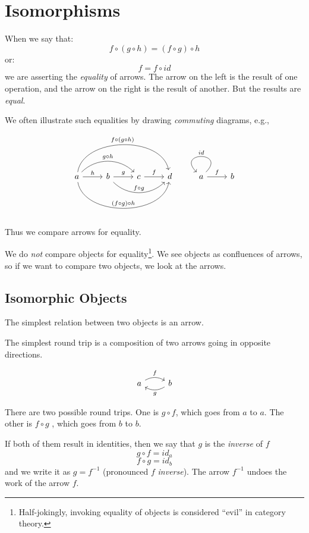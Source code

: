 \documentclass[DaoFP]{subfiles}
\begin{document}
\setcounter{chapter}{2}


\chapter{Isomorphisms}

When we say that:
\[f \circ (g \circ h) = (f \circ g) \circ h \]
or:
\[ f = f \circ id \]
we are asserting the \emph{equality} of arrows. The arrow on the left is the result of one operation, and the arrow on the right is the result of another. But the results are \emph{equal}.

We often illustrate such equalities by drawing \emph{commuting} diagrams, e.g.,

\[
 \begin{tikzcd}
 a
 \arrow[r, "h"]
 \arrow[rr, bend left=45, "g \circ h"]
 \arrow[rrr, bend left=80, "f \circ (g \circ h)"]
 \arrow[rrr, bend right=80, "(f \circ g) \circ h"]
 & b
 \arrow[r, "g"]
 \arrow[rr, bend right=45, "f \circ g"]
 &c
 \arrow[r, "f"]
 &d
 \end{tikzcd}
 \begin{tikzcd}
 a
 \arrow[r, "f"]
 \arrow[r, loop, "id"']
 &b
 \end{tikzcd}
\]

Thus we compare arrows for equality.

We do \emph{not} compare objects for equality\footnote{Half-jokingly, invoking equality of objects is considered ``evil'' in category theory.}. We see objects as confluences of arrows, so if we want to compare two objects, we look at the arrows.

\section{Isomorphic Objects}

The simplest relation between two objects is an arrow.

The simplest round trip is a composition of two arrows going in opposite directions. 

\[
 \begin{tikzcd}
 a
 \arrow[r, bend left, "f"]
 & b
 \arrow[l, bend left, "g"]
 \end{tikzcd}
\]

There are two possible round trips. One is $g \circ f$, which goes from $a$ to $a$. The other is $f \circ g$ , which goes from $b$ to $b$.

If both of them result in identities, then we say that $g$ is the \emph{inverse} of $f$
\[ g \circ f = id_a\]
\[f \circ g = id_b\]
and we write it as $g = f^{-1}$ (pronounced $f$ \emph{inverse}). The arrow $ f^{-1}$ undoes the work of the arrow $f$. 
\end{document}
